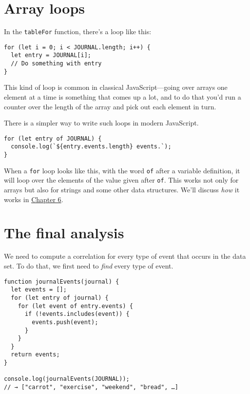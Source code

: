 \label{data.for_of_loop}\section{Array loops}

In the \lstinline`tableFor` function, there's a loop like this:

\begin{lstlisting}
for (let i = 0; i < JOURNAL.length; i++) {
  let entry = JOURNAL[i];
  // Do something with entry
}
\end{lstlisting}
\noindent

This kind of loop is common in classical JavaScript—going over arrays one element at a time is something that comes up a lot, and to do that you'd run a counter over the length of the array and pick out each element in turn.

There is a simpler way to write such loops in modern JavaScript.

\begin{lstlisting}
for (let entry of JOURNAL) {
  console.log(`${entry.events.length} events.`);
}
\end{lstlisting}
\noindent{}

When a \lstinline`for` loop looks like this, with the word \lstinline`of` after a variable definition, it will loop over the elements of the value given after \lstinline`of`. This works not only for arrays but also for strings and some other data structures. We'll discuss \emph{how} it works in \hyperref[object]{Chapter 6}.

\label{data.analysis}\section{The final analysis}

We need to compute a correlation for every type of event that occurs in the data set. To do that, we first need to \emph{find} every type of event.

\begin{lstlisting}
function journalEvents(journal) {
  let events = [];
  for (let entry of journal) {
    for (let event of entry.events) {
      if (!events.includes(event)) {
        events.push(event);
      }
    }
  }
  return events;
}

console.log(journalEvents(JOURNAL));
// → ["carrot", "exercise", "weekend", "bread", …]
\end{lstlisting}
\noindent

